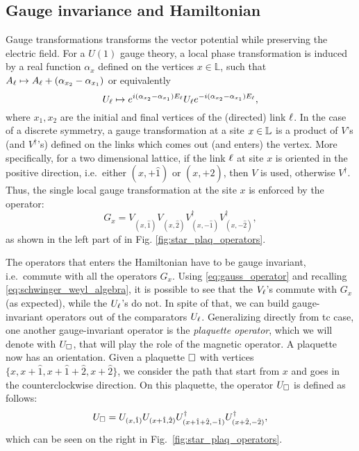 %
%
\subsection{Gauge invariance and Hamiltonian}%
\label{sub:gauge_invariance_and_hamiltonian}

Gauge transformations transforms the vector potential while preserving the electric field.
For a $U(1)$ gauge theory, a local phase transformation is induced by a real function $\alpha_x$
defined on the vertices $x\in \mathbb L$, such that  $A_{\ell} \mapsto A_{\ell} + (\alpha_{x_2} - \alpha_{x_1})$ or equivalently
\begin{equation}
    U_{\ell} \mapsto
    e^{i(\alpha_{x_2} - \alpha_{x_1}) E_{\ell}}  U_{\ell}   e^{-i(\alpha_{x_2} - \alpha_{x_1} )E_{\ell}},
\end{equation}
where $x_1, x_2$ are the initial and final vertices of the (directed) link $\ell$.
In the case of a discrete symmetry, a gauge transformation at a site $x \in \mathbb{L}$ is a product of $V$'s (and $V^\dagger$'s) defined on the links which comes out (and enters) the vertex.
More specifically, for a two dimensional lattice,
if the link $\ell$ at site $x$ is oriented in the positive direction, i.e.~either $(x, +\hat{1})$ or $(x, +\hat{2})$, then $V$ is used, otherwise $V^\dagger$.
Thus, the single local gauge transformation at the site $x$ is enforced by the operator:
\begin{equation}
    G_x =
    V_{(x, \hat{1})}^{\phantom{\dagger}}
    V_{(x, \hat{2})}^{\phantom{\dagger}}
    V^\dagger_{(x, -\hat{1})}
    V^\dagger_{(x, -\hat{2})},
    \label{eq:gauss_operator}
\end{equation}
as shown in the left part of in Fig. \ref{fig:star_plaq_operators}.

The operators that enters the Hamiltonian have to be gauge invariant, i.e.~commute with all the operators $G_x$.
Using \eqref{eq:gauss_operator} and recalling \eqref{eq:schwinger_weyl_algebra}, it is possible to see that the $V_\ell$'s commute with $G_x$ (as expected), while the $U_\ell$'s do not.
In spite of that, we can build gauge-invariant operators out of the comparators $U_\ell$.
Generalizing directly from \ac{tc} case, one another gauge-invariant operator is the \emph{plaquette operator}, which we will denote with $U_{\square}$, that will play the role of the magnetic operator.
A plaquette now has an orientation.
Given a plaquette $\square$ with vertices $\{x, x+\hat{1}, x+\hat{1}+\hat{2}, x+\hat{2}\}$, we consider the path that start from $x$ and goes in the counterclockwise direction.
On this plaquette, the operator $U_{\square}$ is defined as follows:
\begin{equation}
    U_{\square} =
    U_{(x, \hat{1})}
    U_{(x + \hat{1}, \hat{2})}
    U_{(x + \hat{1} + \hat{2}, -\hat{1})}^\dagger
    U_{(x + \hat{2}, -\hat{2})}^\dagger,
    \label{eq:plaq_operator}
\end{equation}
which can be seen on the right in Fig.~\ref{fig:star_plaq_operators}.

